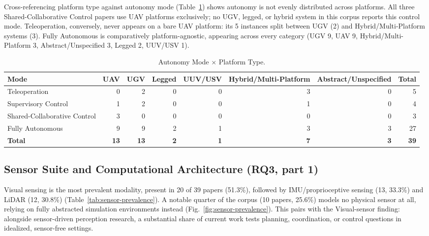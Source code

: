 \documentclass[journal]{IEEEtran}
\begin{document}
Cross-referencing platform type against autonomy mode (Table~\ref{tab:autonomy-x-platform}) shows autonomy is not evenly distributed across platforms. All three Shared-Collaborative Control papers use UAV platforms exclusively; no UGV, legged, or hybrid system in this corpus reports this control mode. Teleoperation, conversely, never appears on a bare UAV platform: its 5 instances split between UGV (2) and Hybrid/Multi-Platform systems (3). Fully Autonomous is comparatively platform-agnostic, appearing across every category (UGV 9, UAV 9, Hybrid/Multi-Platform 3, Abstract/Unspecified 3, Legged 2, UUV/USV 1).

\begin{table}[t]
\caption{Autonomy Mode $\times$ Platform Type.}
\label{tab:autonomy-x-platform}
\centering
\begin{tabular}{@{}lrrrrrrr@{}}
\toprule
\textbf{Mode} & \textbf{UAV} & \textbf{UGV} & \textbf{Legged} & \textbf{UUV/USV} & \textbf{Hybrid/Multi-Platform} & \textbf{Abstract/Unspecified} & \textbf{Total} \\
\midrule
Teleoperation & 0 & 2 & 0 & 0 & 3 & 0 & 5 \\
Supervisory Control & 1 & 2 & 0 & 0 & 1 & 0 & 4 \\
Shared-Collaborative Control & 3 & 0 & 0 & 0 & 0 & 0 & 3 \\
Fully Autonomous & 9 & 9 & 2 & 1 & 3 & 3 & 27 \\
\midrule
\textbf{Total} & \textbf{13} & \textbf{13} & \textbf{2} & \textbf{1} & \textbf{7} & \textbf{3} & \textbf{39} \\
\bottomrule
\end{tabular}
\end{table}


\subsection{Sensor Suite and Computational Architecture (RQ3, part 1)}

Visual sensing is the most prevalent modality, present in 20 of 39 papers (51.3\%), followed by IMU/proprioceptive sensing (13, 33.3\%) and LiDAR (12, 30.8\%) (Table~\ref{tab:sensor-prevalence}). A notable quarter of the corpus (10 papers, 25.6\%) models no physical sensor at all, relying on fully abstracted simulation environments instead (Fig.~\ref{fig:sensor-prevalence}). This pairs with the Visual-sensor finding: alongside sensor-driven perception research, a substantial share of current work tests planning, coordination, or control questions in idealized, sensor-free settings.
\end{document}
